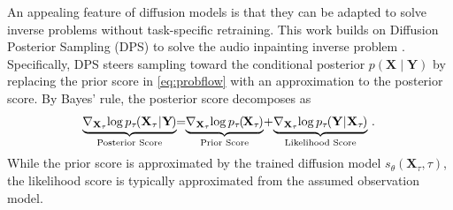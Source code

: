 \documentclass{article}
\begin{document}
An appealing feature of diffusion models is that they can be adapted to solve inverse problems without task-specific retraining.
This work builds on Diffusion Posterior Sampling (DPS) \cite{chung2023diffusion} to solve the audio inpainting inverse problem \cite{moliner_diffusion-based_2024}.
Specifically, DPS steers sampling toward the conditional posterior $p(\mathbf{X}\mid\mathbf{Y})$ by replacing the prior score in \eqref{eq:probflow} with an approximation to the posterior score.
By Bayes' rule, the posterior score decomposes as
\begin{equation}
\hspace{-2pt}
\underbrace{\nabla_{\mathbf{X}_\tau}
\hspace{-2pt}
 \log p_\tau
\hspace{-1pt}
 (\mathbf{X}_\tau 
\hspace{-2.5pt}
\mid 
\hspace{-2.5pt}
\mathbf{Y}
\hspace{-1pt}
)}_{\text{Posterior Score}}
\hspace{-3pt}
= 
\hspace{-3pt}
\underbrace{\nabla_{\mathbf{X}_\tau} 
\hspace{-2pt}
\log p_\tau
\hspace{-1pt}
(
\hspace{-1pt}
    \mathbf{X}_\tau
\hspace{-1pt}
)}_{\text{Prior Score}} 
\hspace{-1.5pt}
 + 
\hspace{-1.5pt}
 \underbrace{\nabla_{\mathbf{X}_\tau} 
\hspace{-2pt}
 \log p_\tau
\hspace{-1pt}
 (\mathbf{Y} 
\hspace{-2.5pt}
 \mid
\hspace{-2.5pt}
  \mathbf{X}_\tau
\hspace{-1pt}
  )}_{\text{Likelihood Score}} \, .
\label{eq:bayes_score_decomp}
\end{equation}
While the prior score is approximated by the trained diffusion model $s_\theta(\mathbf{X}_\tau, \tau)$, the likelihood score is typically approximated from the assumed observation model.
\end{document}
